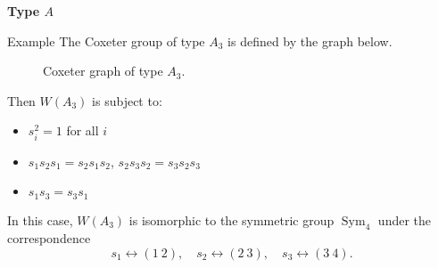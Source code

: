 \documentclass[9pt,handout]{beamer}
\newcommand{\<}{\langle}
\renewcommand{\>}{\rangle}
\DeclareMathOperator{\Sym}{Sym}
\begin{document}
\begin{frame}{\textbf{Type $A$}}\pause

\begin{block}{Example}
The Coxeter group of type $A_3$ is defined by the graph below.
\begin{figure}
\caption{Coxeter graph of type $A_3$.}
\end{figure}
\vspace{-1em}
\pause Then $W(A_{3})$ is subject to: \pause 
\begin{itemize}
\item $s_{i}^{2}=1$ for all $i$ \pause
\item $s_{1}s_{2}s_{1}=s_{2}s_{1}s_{2}$, \quad $s_{2}s_{3}s_{2}=s_{3}s_{2}s_{3}$ \pause 
\item $s_{1}s_{3}=s_{3}s_{1}$
\end{itemize}

\pause
\medskip

In this case, $W(A_3)$ is isomorphic to the symmetric group $\Sym_4$ under the correspondence
	\[
	s_1 \leftrightarrow (1\ 2), \quad s_2 \leftrightarrow (2\ 3), \quad s_3 \leftrightarrow (3\ 4).
	\]
\end{block}

\end{frame}

\end{document}
